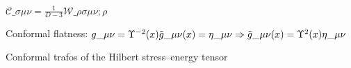 \begin{draft}
{{    $ \mathcal{C}\_{\sigma\mu\nu}  = \frac{1}{D-3}  \mathcal{W}\_{\rho\sigma\mu\nu;\rho} $
    
    
    
    }
    
    
    
    
    \begin{bullets}
        \item Conformal flatness: $g\_{\mu\nu}= \Upsilon^{-2}(x) \tilde{g}\_{\mu\nu} (x)= \eta\_{\mu\nu} \Rightarrow \tilde{g}\_{\mu\nu}(x)=\Upsilon^2(x) \eta\_{\mu\nu} $
        \item Conformal trafos of the Hilbert stress--energy tensor
    \end{bullets}
    
    
    
    
    }
    \end{draft}
    
    
    
    
    
